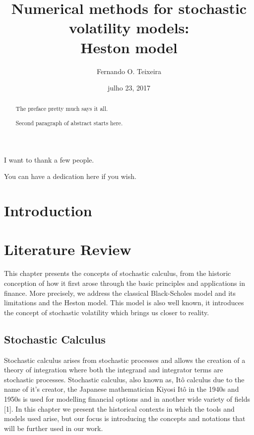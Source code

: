 \documentclass[12pt,twoside]{reedthesis}
\title{\textbf{\Huge{Numerical methods for stochastic volatility models: \\[20pt] Heston model}}}
\author{Fernando O. Teixeira}
\date{julho 23, 2017}
\theoremstyle{definition}
\theoremstyle{definition}
\theoremstyle{remark}
\begin{document}
      \maketitle
  
  \frontmatter %
  \pagestyle{empty} %
      \begin{acknowledgements}
      I want to thank a few people.
    \end{acknowledgements}
  
      \hypersetup{linkcolor=black}
    \setcounter{tocdepth}{2}
    \tableofcontents
  
      \listoftables
  
      \listoffigures
      \begin{abstract}
      The preface pretty much says it all. \par  Second paragraph of abstract
      starts here.
    \end{abstract}
      \begin{dedication}
      You can have a dedication here if you wish.
    \end{dedication}
  \mainmatter %
  \pagestyle{fancyplain} %

  \chapter{Introduction}\label{intro}
  
  \chapter{Literature Review}\label{lt-review}
  
  This chapter presents the concepts of stochastic calculus, from the
  historic conception of how it first arose through the basic principles
  and applications in finance. More precisely, we address the classical
  Black-Scholes model and its limitations and the Heston model. This model
  is also well known, it introduces the concept of stochastic volatility
  which brings us closer to reality.
  
  \section{Stochastic Calculus}\label{stochastic-calculus}
  
  Stochastic calculus arises from stochastic processes and allows the
  creation of a theory of integration where both the integrand and
  integrator terms are stochastic processes. Stochastic calculus, also
  known as, Itô calculus due to the name of it's creator, the Japanese
  mathematician Kiyosi Itô in the 1940s and 1950s is used for modelling
  financial options and in another wide variety of fields {[}1{]}. In this
  chapter we present the historical contexts in which the tools and models
  used arise, but our focus is introducing the concepts and notations that
  will be further used in our work.
  
\end{document}
